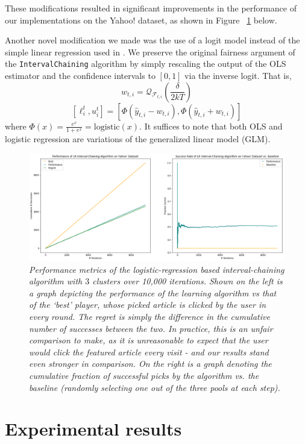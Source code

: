 \documentclass[11pt]{article}
\begin{document}
These modifications resulted in significant improvements in the performance of our implementations on the Yahoo! dataset, as shown in Figure ~\ref{fig:yahoo} below.

Another novel modification we made was the use of a logit model instead of the simple linear regression used in . We preserve the original fairness argument of the \texttt{IntervalChaining} algorithm by simply rescaling the output of the OLS estimator and the confidence intervals to $[0, 1]$ via the inverse logit. That is,
$$w_{t,i} = \mathcal{Q}_{\mathcal{F}_{t,i}}(\frac{\delta}{2kT})$$
$$[\ell_{i}^{t}, u_{i}^{t}] = [\Phi(\hat{y}_{t,i} - w_{t,i}), \Phi(\hat{y}_{t,i} + w_{t,i})]$$
where $\Phi(x) = \frac{e^{x}}{1 + e^{x}} = \text{logistic}(x)$. It suffices to note that both OLS and logistic regression are variations of the generalized linear model (GLM).

\begin{figure}
\includegraphics[width=\textwidth]{yahoo-interval-chaining.png}
\caption{\emph{Performance metrics of the logistic-regression based interval-chaining algorithm with $3$ clusters over 10,000 iterations. Shown on the left is a graph depicting the performance of the learning algorithm vs that of the `best' player, whose picked article is clicked by the user in every round. The regret is simply the difference in the cumulative number of successes between the two. In practice, this is an unfair comparison to make, as it is unreasonable to expect that the user would click the featured article every visit - and our results stand even stronger in comparison. On the right is a graph denoting the cumulative fraction of successful picks by the algorithm vs. the baseline (randomly selecting one out of the three pools at each step).} \label{fig:yahoo}}
\end{figure}

\section{Experimental results}
\end{document}
